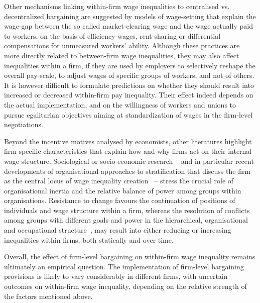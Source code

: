 \documentclass[12pt]{article}
\begin{document}
Other mechanisms linking within-firm wage inequalities to centralised vs. decentralized bargaining are suggested by models of wage-setting that explain the wage-gap between the so called market-clearing wage and the wage actually paid to workers, on the basis of efficiency-wages, rent-sharing or differential compensations for unmeasured workers' ability. Although these practices
are more directly related to between-firm wage inequalities, they may also affect inequalities within a firm, if they are used by employers to selectively reshape the overall pay-scale, to adjust wages of specific groups of workers, and not of others. It is however difficult to formulate predictions on whether they should result into increased or decreased within-firm pay inequality. Their effect indeed depends on the actual implementation, and on the willingness of workers and unions to pursue egalitarian objectives aiming at standardization of wages in the firm-level negotiations.

Beyond the incentive motives analysed by economists, other literatures highlight  firm-specific characteristics that explain how and why firms act on their internal wage structure. Sociological or socio-economic research -- and in particular recent developments of organisational approaches to stratification that discuss the firm as the central locus of wage inequality creation~\citep{stainback2010,cobb2016} -- stress the crucial role of organisational inertia and the relative balance of power among groups within organisations. Resistance to change favours the continuation of positions of individuals and wage structure within a firm, whereas the resolution of conflicts among groups with different goals and power in the hierarchical, organisational and occupational structure~\citep{blau1967american, goldthorpe1972occupational, wright1980class, erikson2002intergenerational}, may result into either reducing or increasing inequalities within firms, both statically and over time. 

Overall, the effect of firm-level bargaining on within-firm wage inequality remains ultimately an empirical question. The implementation of firm-level bargaining provisions is likely to vary considerably in different firms, with uncertain outcomes on within-firm wage inequality, depending on the relative strength of the factors mentioned above. 
\end{document}
